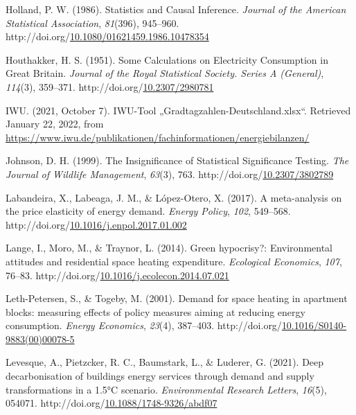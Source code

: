 \documentclass[12pt,twoside]{reedthesis}
\newlength{\cslhangindent}
\newenvironment{CSLReferences}[2] %
 {%
  \setlength{\parindent}{0pt}
  \ifodd #1 \everypar{\setlength{\hangindent}{\cslhangindent}}\ignorespaces\fi
  \ifnum #2 > 0
  \setlength{\parskip}{#2\baselineskip}
  \fi
 }%
 {}
\begin{document}
\begin{CSLReferences}{1}{0}
\leavevmode{}%
Holland, P. W. (1986). Statistics and Causal Inference. \emph{Journal of the American Statistical Association}, \emph{81}(396), 945--960. http://doi.org/\href{https://doi.org/10.1080/01621459.1986.10478354}{10.1080/01621459.1986.10478354}

\leavevmode{}%
Houthakker, H. S. (1951). Some Calculations on Electricity Consumption in Great Britain. \emph{Journal of the Royal Statistical Society. Series A (General)}, \emph{114}(3), 359--371. http://doi.org/\href{https://doi.org/10.2307/2980781}{10.2307/2980781}

\leavevmode{}%
IWU. (2021, October 7). IWU-Tool „Gradtagzahlen-Deutschland.xlsx``. Retrieved January 22, 2022, from \url{https://www.iwu.de/publikationen/fachinformationen/energiebilanzen/}

\leavevmode{}%
Johnson, D. H. (1999). The Insignificance of Statistical Significance Testing. \emph{The Journal of Wildlife Management}, \emph{63}(3), 763. http://doi.org/\href{https://doi.org/10.2307/3802789}{10.2307/3802789}

\leavevmode{}%
Labandeira, X., Labeaga, J. M., \& López-Otero, X. (2017). A meta-analysis on the price elasticity of energy demand. \emph{Energy Policy}, \emph{102}, 549--568. http://doi.org/\href{https://doi.org/10.1016/j.enpol.2017.01.002}{10.1016/j.enpol.2017.01.002}

\leavevmode{}%
Lange, I., Moro, M., \& Traynor, L. (2014). Green hypocrisy?: Environmental attitudes and residential space heating expenditure. \emph{Ecological Economics}, \emph{107}, 76--83. http://doi.org/\href{https://doi.org/10.1016/j.ecolecon.2014.07.021}{10.1016/j.ecolecon.2014.07.021}

\leavevmode{}%
Leth-Petersen, S., \& Togeby, M. (2001). Demand for space heating in apartment blocks: measuring effects of policy measures aiming at reducing energy consumption. \emph{Energy Economics}, \emph{23}(4), 387--403. http://doi.org/\href{https://doi.org/10.1016/S0140-9883(00)00078-5}{10.1016/S0140-9883(00)00078-5}

\leavevmode{}%
Levesque, A., Pietzcker, R. C., Baumstark, L., \& Luderer, G. (2021). Deep decarbonisation of buildings energy services through demand and supply transformations in a 1.5°C scenario. \emph{Environmental Research Letters}, \emph{16}(5), 054071. http://doi.org/\href{https://doi.org/10.1088/1748-9326/abdf07}{10.1088/1748-9326/abdf07}


\end{CSLReferences}
\end{document}
